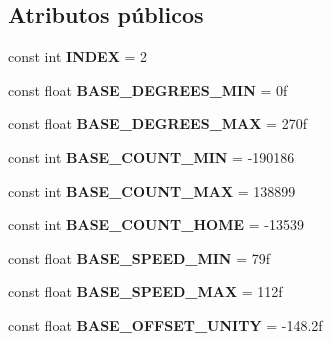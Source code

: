 \subsection*{Atributos públicos}
\begin{DoxyCompactItemize}
\item 
\mbox{\label{class_scorbot_e_r_i_x_v2_a6d1ebca6565451c123e84f40ca111837}} 
const int {\bfseries I\+N\+D\+EX} = 2
\item 
\mbox{\label{class_scorbot_e_r_i_x_v2_a73b61628f57dc85560c7c7627e1bba45}} 
const float {\bfseries B\+A\+S\+E\+\_\+\+D\+E\+G\+R\+E\+E\+S\+\_\+\+M\+IN} = 0f
\item 
\mbox{\label{class_scorbot_e_r_i_x_v2_ab22d886d7fdcbfd0a843f75f4bbed601}} 
const float {\bfseries B\+A\+S\+E\+\_\+\+D\+E\+G\+R\+E\+E\+S\+\_\+\+M\+AX} = 270f
\item 
\mbox{\label{class_scorbot_e_r_i_x_v2_a4d62d0792b7672bd51d33c8b6d978499}} 
const int {\bfseries B\+A\+S\+E\+\_\+\+C\+O\+U\+N\+T\+\_\+\+M\+IN} = -\/190186
\item 
\mbox{\label{class_scorbot_e_r_i_x_v2_ae3f58e6efaae3cf238793265e0f33204}} 
const int {\bfseries B\+A\+S\+E\+\_\+\+C\+O\+U\+N\+T\+\_\+\+M\+AX} = 138899
\item 
\mbox{\label{class_scorbot_e_r_i_x_v2_a8bd067b2afa259c78a6e0d4211dfd93a}} 
const int {\bfseries B\+A\+S\+E\+\_\+\+C\+O\+U\+N\+T\+\_\+\+H\+O\+ME} = -\/13539
\item 
\mbox{\label{class_scorbot_e_r_i_x_v2_aa50be1d53b668df8086552ca553835d1}} 
const float {\bfseries B\+A\+S\+E\+\_\+\+S\+P\+E\+E\+D\+\_\+\+M\+IN} = 79f
\item 
\mbox{\label{class_scorbot_e_r_i_x_v2_a3ae8c9065a135544419c653e3bb2e691}} 
const float {\bfseries B\+A\+S\+E\+\_\+\+S\+P\+E\+E\+D\+\_\+\+M\+AX} = 112f
\item 
\mbox{\label{class_scorbot_e_r_i_x_v2_ae03ae9bfe3341e6176f38671270d9535}} 
const float {\bfseries B\+A\+S\+E\+\_\+\+O\+F\+F\+S\+E\+T\+\_\+\+U\+N\+I\+TY} = -\/148.\+2f

\end{DoxyCompactItemize}
